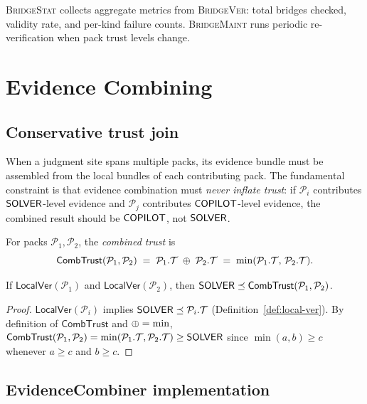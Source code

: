 \documentclass[11pt]{article}
\newcommand{\Pack}{\mathcal{P}}
\newcommand{\LocalVer}{\mathsf{LocalVer}}
\newcommand{\CombTrust}{\ensuremath{\mathsf{CombTrust}}}
\newcommand{\BVer}{\textsc{BridgeVer}}
\newcommand{\BM}{\textsc{BridgeMaint}}
\newcommand{\BStat}{\textsc{BridgeStat}}
\begin{document}
\BStat{} collects aggregate metrics from \BVer{}: total bridges
checked, validity rate, and per-kind failure counts.  \BM{} runs
periodic re-verification when pack trust levels change.

\section{Evidence Combining}
\label{sec:evidence}

\subsection{Conservative trust join}

When a judgment site spans multiple packs, its evidence bundle must
be assembled from the local bundles of each contributing pack.  The
fundamental constraint is that evidence combination must \emph{never
inflate trust}: if $\Pack_i$ contributes $\mathsf{SOLVER}$-level evidence
and $\Pack_j$ contributes $\mathsf{COPILOT}$-level evidence, the combined
result should be $\mathsf{COPILOT}$, not $\mathsf{SOLVER}$.

\begin{definition}
\label{def:comb-trust}
For packs $\Pack_1, \Pack_2$, the \emph{combined trust} is
\[
  \CombTrust(\Pack_1, \Pack_2)
  \;=\;
  \Pack_1.\trust \;\tjoin\; \Pack_2.\trust
  \;=\;
  \min(\Pack_1.\trust,\, \Pack_2.\trust).
\]
\end{definition}

\begin{lemma}
\label{lem:combine-preserves}
If $\LocalVer(\Pack_1)$ and $\LocalVer(\Pack_2)$, then
$\Tsolver \tleq \CombTrust(\Pack_1, \Pack_2)$.
\end{lemma}
\begin{proof}
$\LocalVer(\Pack_i)$ implies $\Tsolver \tleq \Pack_i.\trust$
(Definition~\ref{def:local-ver}).
By definition of $\CombTrust$ and $\oplus = \min$,
$\CombTrust(\Pack_1, \Pack_2) = \min(\Pack_1.\trust, \Pack_2.\trust)
\geq \Tsolver$
since $\min(a, b) \geq c$ whenever $a \geq c$ and $b \geq c$.
\end{proof}

\subsection{EvidenceCombiner implementation}
\end{document}
